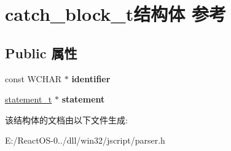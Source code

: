 \hypertarget{structcatch__block__t}{}\section{catch\+\_\+block\+\_\+t结构体 参考}
\label{structcatch__block__t}
\subsection*{Public 属性}
\begin{DoxyCompactItemize}
\item 
\mbox{\label{structcatch__block__t_a3779cb9b1456b0fbfd40637fae8f04f0}} 
const W\+C\+H\+AR $\ast$ {\bfseries identifier}
\item 
\mbox{\label{structcatch__block__t_a358c41212336b0442221f46a4ecc767c}} 
\hyperlink{struct__statement__t}{statement\+\_\+t} $\ast$ {\bfseries statement}
\end{DoxyCompactItemize}


该结构体的文档由以下文件生成\+:\begin{DoxyCompactItemize}
\item 
E\+:/\+React\+O\+S-\/0../dll/win32/jscript/parser.\+h\end{DoxyCompactItemize}
